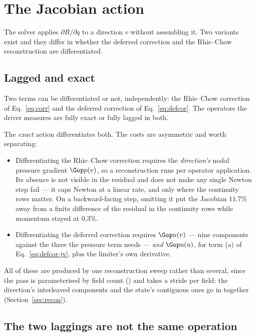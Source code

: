 \section{The Jacobian action}
\label{sec:jac}

The solver applies $\partial R/\partial q$ to a direction $v$ without assembling it. Two variants
exist and they differ in whether the deferred correction and the Rhie--Chow reconstruction are
differentiated.

\subsection{Lagged and exact}

Two terms can be differentiated or not, independently: the Rhie--Chow correction of
Eq.~\eqref{eq:corr} and the deferred correction of Eq.~\eqref{eq:defcor}. The operators the
driver measures are fully exact or fully lagged in both.

The \emph{exact} action differentiates both. The costs are asymmetric and worth separating:

\begin{itemize}
\item Differentiating the Rhie--Chow correction requires the \emph{direction's} nodal pressure
      gradient $\Gop p(v)$, so a reconstruction runs per operator application. Its absence is not
      visible in the residual and does not make any single Newton step fail --- it caps Newton at
      a linear rate, and only where the continuity rows matter. On a backward-facing step,
      omitting it put the Jacobian $11.7\%$ away from a finite difference of the residual in the
      continuity rows while momentum stayed at $0.3\%$.
\item Differentiating the deferred correction requires $\Gop u(v)$ --- nine components against
      the three the pressure term needs --- \emph{and} $\Gop u(u)$, for term (a) of
      Eq.~\eqref{eq:defcor-jv}, plus the limiter's own derivative.
\end{itemize}

All of these are produced by one reconstruction sweep rather than several, since the pass is
parameterised by field count () and takes a stride per field: the direction's
interleaved components and the state's contiguous ones go in together
(Section~\ref{sec:recon}).

\subsection{The two laggings are not the same operation}
\label{sec:jac:asym}

